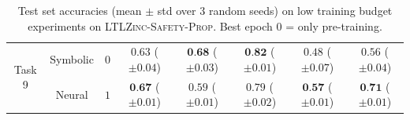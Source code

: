 \begin{table}[!t]
{\begin{tabular}{cccccccc}
			\multirow{2}{*}{Task 9} & Symbolic & $0$ & $0.63 $ {\tiny ($\pm 0.04$)} & $\textbf{0.68} $ {\tiny ($\pm 0.03$)} & $\textbf{0.82} $ {\tiny ($\pm 0.01$)} & $0.48 $ {\tiny ($\pm 0.07$)} & $0.56 $ {\tiny ($\pm 0.04$)}\\
			& Neural & $1$ & $\textbf{0.67} $ {\tiny ($\pm 0.01$)} & $0.59 $ {\tiny ($\pm 0.01$)} & $0.79 $ {\tiny ($\pm 0.02$)} & $\textbf{0.57} $ {\tiny ($\pm 0.01$)} & $\textbf{0.71} $ {\tiny ($\pm 0.01$)}\\
			\bottomrule
		\end{tabular}
	}
	\caption[Low training budget experiments on \textsc{LTLZinc-Safety-Prop}]{Test set accuracies (mean $\pm$ std over 3 random seeds) on low training budget experiments on \textsc{LTLZinc-Safety-Prop}. Best epoch 0 = only pre-training.}\label{ansya:tab:1epochprop}
\end{table}

